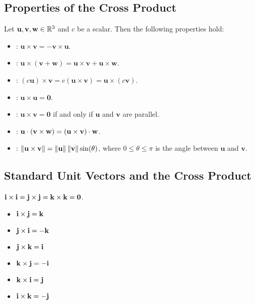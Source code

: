 \subsection{Properties of the Cross Product}

Let \(\mathbf{u}, \mathbf{v}, \mathbf{w} \in \mathbb{R}^{3}\) and \(c\) be a scalar. Then the following properties hold:
\begin{itemize}
    \item {}: \(\mathbf{u} \times \mathbf{v} = -\mathbf{v} \times \mathbf{u}\).
    \item {}: \(\mathbf{u} \times (\mathbf{v} + \mathbf{w}) = \mathbf{u} \times \mathbf{v} + \mathbf{u} \times \mathbf{w}\).
    \item {}: \((c\mathbf{u}) \times \mathbf{v} = c(\mathbf{u} \times \mathbf{v}) = \mathbf{u} \times (c\mathbf{v})\).
    \item {}: \(\mathbf{u} \times \mathbf{u} = \mathbf{0}\).
    \item {}: \(\mathbf{u} \times \mathbf{v} = \mathbf{0}\) if and only if \(\mathbf{u}\) and \(\mathbf{v}\) are parallel.
    \item {}: \(\mathbf{u} \cdot (\mathbf{v} \times \mathbf{w}) = (\mathbf{u} \times \mathbf{v}) \cdot \mathbf{w}\).
    \item {}: \(\left\lVert \mathbf{u \times v}\right\rVert = \left\lVert \mathbf{u}\right\rVert\left\lVert \mathbf{v}\right\rVert\sin(\theta)\), where \(0 \leq \theta \leq \pi\) is the angle between \(\mathbf{u}\) and \(\mathbf{v}\).
\end{itemize}

\subsection{Standard Unit Vectors and the Cross Product}

\(\mathbf{i} \times \mathbf{i} = \mathbf{j} \times \mathbf{j} = \mathbf{k} \times \mathbf{k} = \mathbf{0}\).
\begin{multicols}{2}
    \begin{itemize}
        \item \(\mathbf{i} \times \mathbf{j} = \mathbf{k}\) 
        \item \(\mathbf{j} \times \mathbf{i} = -\mathbf{k}\)
        \item \(\mathbf{j} \times \mathbf{k} = \mathbf{i}\) 
        \item \(\mathbf{k} \times \mathbf{j} = -\mathbf{i}\)
        \item \(\mathbf{k} \times \mathbf{i} = \mathbf{j}\) 
        \item \(\mathbf{i} \times \mathbf{k} = -\mathbf{j}\)
    \end{itemize}
\end{multicols}


